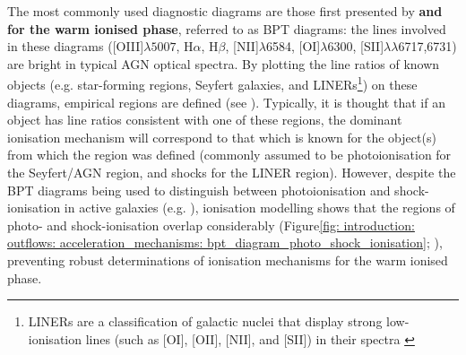 The most commonly used diagnostic diagrams are those first presented by \citet{Baldwin1981} \textbf{and \citet{Veilleux1987} for the warm ionised phase}, referred to as BPT diagrams: the lines involved in these diagrams ([OIII]$\lambda5007$, H$\alpha$, H$\beta$, [NII]$\lambda$6584, [OI]$\lambda$6300, [SII]$\lambda\lambda$6717,6731) are bright in typical AGN optical spectra. By plotting the line ratios of known objects (e.g. star-forming regions, Seyfert galaxies, and LINERs\footnote{LINERs are a classification of galactic nuclei that display strong low-ionisation lines (such as [OI], [OII], [NII], and [SII]) in their spectra \citep{Heckman1980}}) on these diagrams, empirical regions are defined (see \citealt{Kewley2006}). Typically, it is thought that if an object has line ratios consistent with one of these regions, the dominant ionisation mechanism will correspond to that which is known for the object(s) from which the region was defined (commonly assumed to be photoionisation for the Seyfert/AGN region, and shocks for the LINER region). However, despite the BPT diagrams being used to distinguish between photoionisation and shock-ionisation in active galaxies (e.g. \citealt{Mingozzi2019, Venturi2021, Venturi2023, Revalski2021}), ionisation modelling shows that the regions of photo- and shock-ionisation overlap considerably (Figure\;\ref{fig: introduction: outflows: acceleration_mechanisms: bpt_diagram_photo_shock_ionisation}; \citealt{Dopita1995, Dopita1996, Allen2008, Ji2020}), preventing robust determinations of ionisation mechanisms for the warm ionised phase. 

